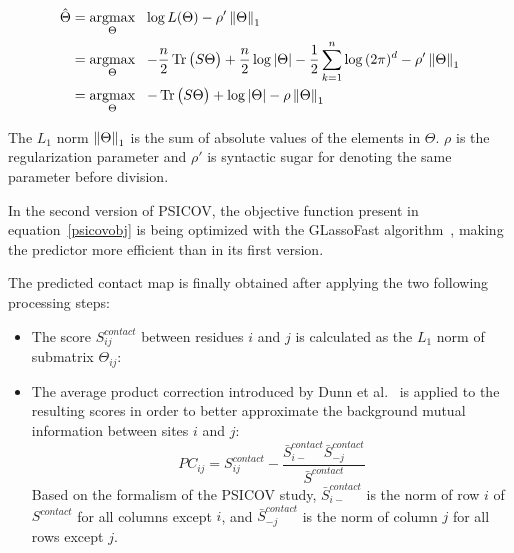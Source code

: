         \begin{equation} \label{psicovobj}
            \begin{split}
                \hat{\Theta} & = \argmax_{\Theta} \ \ \log{L}(\Theta) - \rho' \norm{\Theta}_1 \\
                & = \argmax_{\Theta} \ \ -\frac{n}{2} \trace\big(S \Theta\big) + \frac{n}{2} \log{\vert\Theta\vert}
                    - \frac{1}{2} \sum\limits_{k=1}^{n} \log{(2\pi)^d} - \rho' \norm{\Theta}_1 \\
                & = \argmax_{\Theta} \ \ -\trace\big(S \Theta\big) + \log{\vert\Theta\vert} - \rho \norm{\Theta}_1 \\
            \end{split}
        \end{equation}

        The $L_1$ norm $\left\lVert\Theta\right\rVert_1$ is the sum of absolute values of the elements in $\Theta$.
        $\rho$ is the regularization parameter and $\rho'$ is syntactic sugar for denoting the same
        parameter before division.

        In the second version of PSICOV, the objective function present in equation~\ref{psicovobj} is being
        optimized with the GLassoFast algorithm~\cite{sustik2012glassofast}, making the predictor more efficient
        than in its first version.

        The predicted contact map is finally obtained after applying the two following processing steps:
        \begin{itemize}
            \item The score $S_{ij}^{contact}$ between residues $i$ and $j$ is calculated as
                the $L_1$ norm of submatrix $\Theta_{ij}$:
            \item The average product correction introduced by Dunn et al.~\cite{dunn2007mutual}
                is applied to the resulting scores in order to better approximate the background
                mutual information between sites $i$ and $j$:
                \begin{equation}
                    PC_{ij} = S_{ij}^{contact} - \frac{\bar{S}_{i-}^{contact} \bar{S}_{-j}^{contact}}{\bar{S}^{contact}}
                \end{equation}
                Based on the formalism of the PSICOV study, $\bar{S}_{i-}^{contact}$ is the norm of row $i$ of $S^{contact}$
                for all columns except $i$, and $\bar{S}_{-j}^{contact}$ is the norm of column $j$ for all rows except $j$.
        \end{itemize}

